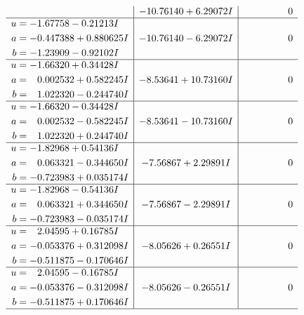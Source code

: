 \documentclass[1p]{elsarticle_modified}
\theoremstyle{definition}
\begin{document}
$$\begin{array}{c|c|c}
 & -10.76140 + 6.29072 I & \phantom{-0.000000 } 0 \\ \hline\begin{aligned}
u &= -1.67758 - 0.21213 I \\
a &= -0.447388 + 0.880625 I \\
b &= -1.23909 - 0.92102 I\end{aligned}
 & -10.76140 - 6.29072 I & \phantom{-0.000000 } 0 \\ \hline\begin{aligned}
u &= -1.66320 + 0.34428 I \\
a &= \phantom{-}0.002532 + 0.582245 I \\
b &= \phantom{-}1.022320 - 0.244740 I\end{aligned}
 & -8.53641 + 10.73160 I & \phantom{-0.000000 } 0 \\ \hline\begin{aligned}
u &= -1.66320 - 0.34428 I \\
a &= \phantom{-}0.002532 - 0.582245 I \\
b &= \phantom{-}1.022320 + 0.244740 I\end{aligned}
 & -8.53641 - 10.73160 I & \phantom{-0.000000 } 0 \\ \hline\begin{aligned}
u &= -1.82968 + 0.54136 I \\
a &= \phantom{-}0.063321 - 0.344650 I \\
b &= -0.723983 + 0.035174 I\end{aligned}
 & -7.56867 + 2.29891 I & \phantom{-0.000000 } 0 \\ \hline\begin{aligned}
u &= -1.82968 - 0.54136 I \\
a &= \phantom{-}0.063321 + 0.344650 I \\
b &= -0.723983 - 0.035174 I\end{aligned}
 & -7.56867 - 2.29891 I & \phantom{-0.000000 } 0 \\ \hline\begin{aligned}
u &= \phantom{-}2.04595 + 0.16785 I \\
a &= -0.053376 + 0.312098 I \\
b &= -0.511875 - 0.170646 I\end{aligned}
 & -8.05626 + 0.26551 I & \phantom{-0.000000 } 0 \\ \hline\begin{aligned}
u &= \phantom{-}2.04595 - 0.16785 I \\
a &= -0.053376 - 0.312098 I \\
b &= -0.511875 + 0.170646 I\end{aligned}
 & -8.05626 - 0.26551 I & \phantom{-0.000000 } 0\\
 \hline 
 \end{array}$$\newpage\newpage\renewcommand{\arraystretch}{1}
\end{document}
